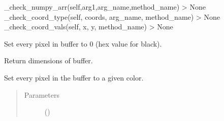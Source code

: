 \documentclass[letterpaper,10pt,english,openany,oneside]{sphinxmanual}
\begin{document}
\begin{fulllineitems}
\begin{fulllineitems}
\sphinxAtStartPar
\_check\_numpy\_arr(self,arg1,arg\_name,method\_name) \sphinxhyphen{}\textgreater{} None
\_check\_coord\_type(self, coords, arg\_name, method\_name) \sphinxhyphen{}\textgreater{} None
\_check\_coord\_vals(self, x, y, method\_name) \sphinxhyphen{}\textgreater{} None

\end{fulllineitems}


\begin{fulllineitems}
\label{\detokenize{dpav:dpav.vbuffer.VBuffer.clear}}
\sphinxAtStartPar
Set every pixel in buffer to 0 (hex value for black).

\end{fulllineitems}


\begin{fulllineitems}
\label{\detokenize{dpav:dpav.vbuffer.VBuffer.dimensions}}
\sphinxAtStartPar
Return dimensions of buffer.

\end{fulllineitems}


\begin{fulllineitems}
\label{\detokenize{dpav:dpav.vbuffer.VBuffer.fill}}
\sphinxAtStartPar
Set every pixel in the buffer to a given color.
\begin{quote}\begin{description}
\item[{Parameters}] \leavevmode
\sphinxAtStartPar
{} () \textendash{} 

\end{description}\end{quote}


\end{fulllineitems}
\end{fulllineitems}
\end{document}
